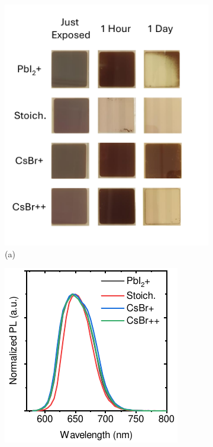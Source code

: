 \begin{figure}[htbp]
    \centering
    \begin{subfigure}[t]{0.49\textwidth}
        \centering
        \includegraphics[width=\textwidth]{chapters/stability/imeges/Stability_Rotation_Stoichiometries.pdf} %
        \caption*{(a)}
    \end{subfigure}
    \hfill
    \begin{subfigure}[t]{0.45\textwidth}
        \centering
        \includegraphics[width=\textwidth]{chapters/stability/imeges/PL_Normalized.pdf} %

\end{subfigure}
\end{figure}

